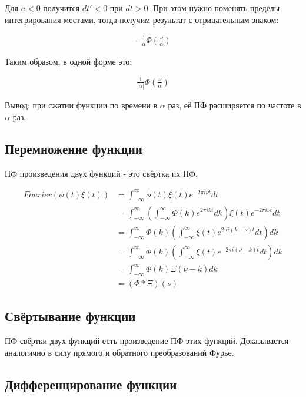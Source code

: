 \documentclass[a4paper,12pt]{report}
\begin{document}
Для $a < 0$ получится $dt' < 0$ при $dt > 0$. При этом нужно поменять пределы интегрирования местами, тогда получим результат с отрицательным знаком:

\[
    \begin{aligned}
        -\frac{1}{\alpha} \Phi\left(\frac{\nu}{\alpha}\right)
    \end{aligned}
\]

Таким образом, в одной форме это:

\[
    \begin{aligned}
        \frac{1}{\left|\alpha\right|} \Phi\left(\frac{\nu}{\alpha}\right)
    \end{aligned}
\]

Вывод: при сжатии функции по времени в $\alpha$ раз, её ПФ расширяется по частоте в $\alpha$ раз.

\subsection{Перемножение функции}

ПФ произведения двух функций - это свёртка их ПФ.

\[
    \begin{aligned}
        Fourier\left(\phi(t)\xi(t)\right) 
        &= \int_{-\infty}^{\infty} \phi(t)\xi(t) e^{-2\pi i\nu t} dt \\
        &= \int_{-\infty}^{\infty} \left( \int_{-\infty}^{\infty} \Phi(k) e^{2\pi i kt} dk \right) \xi(t) e^{-2\pi i\nu t} dt \\
        &= \int_{-\infty}^{\infty} \Phi(k) \left( \int_{-\infty}^{\infty} \xi(t) e^{2\pi i (k - \nu)t} dt \right) dk \\
        &= \int_{-\infty}^{\infty} \Phi(k) \left( \int_{-\infty}^{\infty} \xi(t) e^{-2\pi i (\nu - k)t} dt \right) dk \\
        &= \int_{-\infty}^{\infty} \Phi(k) \Xi(\nu - k) dk \\
        &= \left(\Phi * \Xi\right)(\nu)
    \end{aligned}
\]

\subsection{Свёртывание функции}

ПФ свёртки двух функций есть произведение ПФ этих функций. Доказывается аналогично в силу  прямого и обратного преобразований Фурье.

\subsection{Дифференцирование функции}
\end{document}
